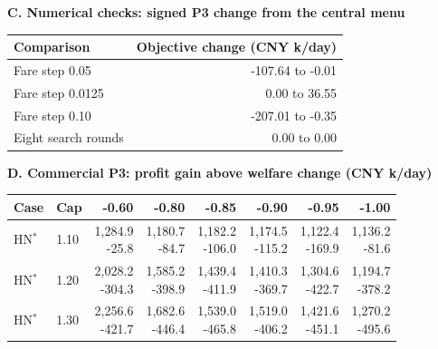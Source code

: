 \begin{table}[htbp]
\begin{minipage}{.95\textwidth}
\par\noindent\textbf{C. Numerical checks: signed P3 change from the central menu}\par\smallskip
\begin{tabular*}{\linewidth}{@{\extracolsep{\fill}}lr@{}}\toprule
Comparison & Objective change (CNY k/day) \\
\midrule
Fare step 0.05 & -107.64 to -0.01 \\
Fare step 0.0125 & 0.00 to 36.55 \\
Fare step 0.10 & -207.01 to -0.35 \\
Eight search rounds & 0.00 to 0.00 \\
\bottomrule\end{tabular*}\par\medskip
\par\noindent\textbf{D. Commercial P3: profit gain above welfare change (CNY k/day)}\par\smallskip
\begin{tabular*}{\linewidth}{@{\extracolsep{\fill}}llrrrrrr@{}}\toprule
Case & Cap & -0.60 & -0.80 & -0.85 & -0.90 & -0.95 & -1.00 \\
\midrule
HN$^{*}$ & 1.10 & \shortstack{1,284.9\\-25.8} & \shortstack{1,180.7\\-84.7} & \shortstack{1,182.2\\-106.0} & \shortstack{1,174.5\\-115.2} & \shortstack{1,122.4\\-169.9} & \shortstack{1,136.2\\-81.6} \\
HN$^{*}$ & 1.20 & \shortstack{2,028.2\\-304.3} & \shortstack{1,585.2\\-398.9} & \shortstack{1,439.4\\-411.9} & \shortstack{1,410.3\\-369.7} & \shortstack{1,304.6\\-422.7} & \shortstack{1,194.7\\-378.2} \\
HN$^{*}$ & 1.30 & \shortstack{2,256.6\\-421.7} & \shortstack{1,682.6\\-446.4} & \shortstack{1,539.0\\-465.8} & \shortstack{1,519.0\\-406.2} & \shortstack{1,421.6\\-451.1} & \shortstack{1,270.2\\-495.6} \\

\end{tabular*}
\end{minipage}
\end{table}
